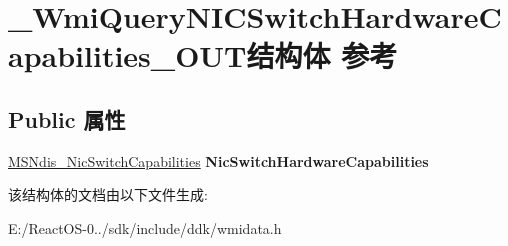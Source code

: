 \hypertarget{struct___wmi_query_n_i_c_switch_hardware_capabilities___o_u_t}{}\section{\+\_\+\+Wmi\+Query\+N\+I\+C\+Switch\+Hardware\+Capabilities\+\_\+\+O\+U\+T结构体 参考}
\label{struct___wmi_query_n_i_c_switch_hardware_capabilities___o_u_t}
\subsection*{Public 属性}
\begin{DoxyCompactItemize}
\item 
\mbox{\label{struct___wmi_query_n_i_c_switch_hardware_capabilities___o_u_t_adb4192b83834b93dc4cf48c79dce4869}} 
\hyperlink{struct___m_s_ndis___nic_switch_capabilities}{M\+S\+Ndis\+\_\+\+Nic\+Switch\+Capabilities} {\bfseries Nic\+Switch\+Hardware\+Capabilities}
\end{DoxyCompactItemize}


该结构体的文档由以下文件生成\+:\begin{DoxyCompactItemize}
\item 
E\+:/\+React\+O\+S-\/0../sdk/include/ddk/wmidata.\+h\end{DoxyCompactItemize}
